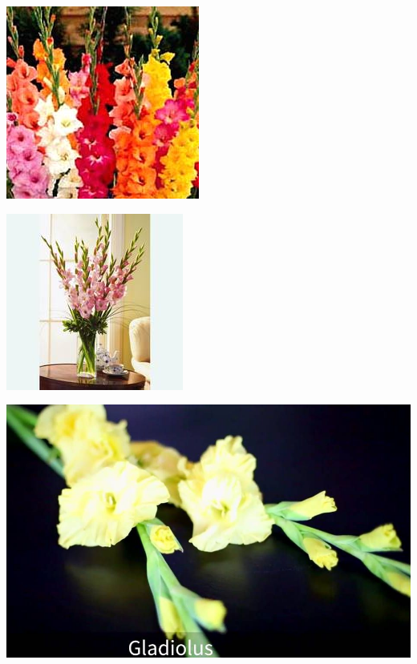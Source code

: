 \documentclass{article}
\begin{document}
\begin{center}
\includegraphics[height=0.9\textheight, angle=90]{../Gladiolous.jpg}
\end{center}
\newpage

\begin{center}
\includegraphics[height=0.9\textheight, angle=90]{../Gladiolous_Bouquet.jpg}
\end{center}
\newpage

\begin{center}
\includegraphics[height=0.9\textheight, angle=90]{../Gladiolus.jpg}
\end{center}
\newpage
\end{document}
